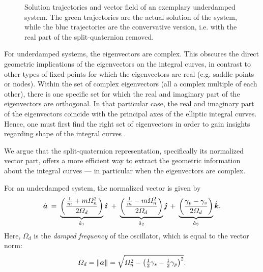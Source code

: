\begin{figure}[ht!]
    \centering
    
    \caption{Solution trajectories and vector field of an exemplary underdamped system. The green trajectories are the actual solution of the system, while the blue trajectories are the convervative version, i.e. with the real part of the split-quaternion removed.}
    \label{fig:underdamped}
\end{figure}

For underdamped systems, the eigenvectors are complex. This obscures the direct geometric implications of the eigenvectors on the integral curves, in contrast to other types of fixed points for which the eigenvectors are real (e.g. saddle points or nodes). Within the set of complex eigenvectors (all a complex multiple of each other), there is one specific set for which the real and imaginary part of the eigenvectors are orthogonal. In that particular case, the real and imaginary part of the eigenvectors coincide with the principal axes of the elliptic integral curves. Hence, one must first find the right set of eigenvectors in order to gain insights regarding shape of the integral curves \cite{Edwards2018}.

We argue that the split-quaternion representation, specifically its normalized vector part, offers a more efficient way to extract the geometric information about the integral curves --- in particular when the eigenvectors are complex.

For an underdamped system, the normalized vector is given by
\begin{equation}
    \uvec{a} \:= \:\underbrace{\qty(\frac{\tfrac{1}{m} + m\Omega_n^2}{2\Omega_d})}_{\hat{a}_1}\quati \: 
                 + \:\underbrace{\qty(\frac{\tfrac{1}{m} - m\Omega_n^2}{2\Omega_d})}_{\hat{a}_2}\quatj \: 
                 + \:\underbrace{\qty(\frac{\gamma_p - \gamma_s}{2\Omega_d})}_{\hat{a}_3}\quatk.
    \label{eq:ddho_vector}
\end{equation}
Here, \(\Omega_d\) is the \emph{damped frequency} of the oscillator, which is equal to the vector norm:
\begin{equation}
    \Omega_d = \norm{\vec{a}} = \sqrt{\Omega^2_n - \qty(\tfrac{1}{2}\gamma_s - \tfrac{1}{2}\gamma_p)^2}.
\end{equation}

